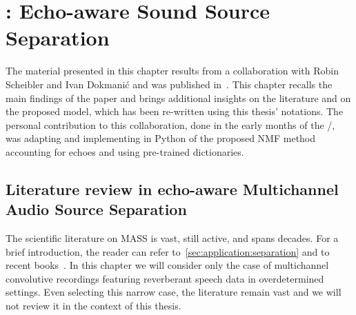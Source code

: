 \chapter{: Echo-aware Sound Source Separation}\label{ch:separake}

\vspace{-2.5em}
  \synopsisChSeparake

\mynewline
The material presented in this chapter results from a collaboration with Robin Scheibler and Ivan Dokmani\'{c} and was published in~\cite{scheibler2018separake}.
This chapter recalls the main findings of the paper and brings additional insights on the literature and on the proposed model, which has been re-written using this thesis' notations.
The personal contribution to this collaboration, done in the early months of the \PhD/, was adapting and implementing in Python of the proposed \ac{NMF} method accounting for echoes and using pre-trained dictionaries.

\section{Literature review in echo-aware Multichannel Audio Source Separation}\label{sec:separake:sota}
The scientific literature on \ac{MASS} is vast, still active, and spans decades.
For a brief introduction, the reader can refer to~\cref{sec:application:separation} and to recent books~.
In this chapter we will consider only the case of multichannel convolutive recordings featuring reverberant speech data in overdetermined settings.
Even selecting this narrow case, the literature remain vast and we will not review it in the context of this thesis.

